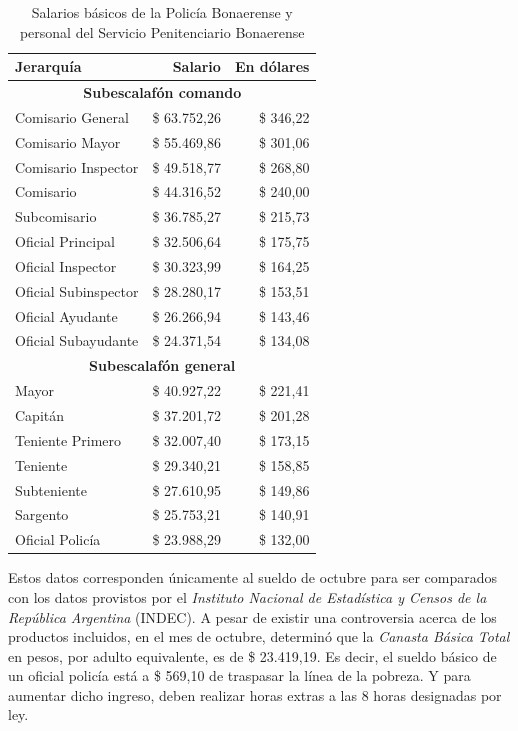 \documentclass[12pt,a4paper,twoside]{book}
\begin{document}
\begin{center}
\begin{longtable}{|l|r|r|}
\caption{Salarios básicos de la Policía Bonaerense y personal del Servicio Penitenciario Bonaerense}
\label{tab:tabla-policia-salario} \\
\hline
\textbf{Jerarquía} & \textbf{Salario} & \textbf{En dólares} \\
\hline
\multicolumn{3}{|c|}{\textbf{Subescalafón comando}} \\
\hline
Comisario General & \$ 63.752,26 & \$ 346,22 \\
\hline
Comisario Mayor & \$ 55.469,86 & \$ 301,06 \\
\hline
Comisario Inspector & \$ 49.518,77 & \$ 268,80 \\
\hline
Comisario & \$ 44.316,52 & \$ 240,00 \\
\hline
Subcomisario & \$ 36.785,27 & \$ 215,73 \\
\hline
Oficial Principal & \$ 32.506,64 & \$ 175,75 \\
\hline
Oficial Inspector & \$ 30.323,99 & \$ 164,25 \\
\hline
Oficial Subinspector & \$ 28.280,17 & \$ 153,51 \\
\hline
Oficial Ayudante & \$ 26.266,94 & \$ 143,46 \\
\hline
Oficial Subayudante & \$ 24.371,54 & \$ 134,08 \\
\hline
\multicolumn{3}{|c|}{\textbf{Subescalafón general}} \\
\hline
Mayor & \$ 40.927,22 & \$ 221,41 \\
\hline
Capitán & \$ 37.201,72 & \$ 201,28 \\
\hline
Teniente Primero & \$ 32.007,40 & \$ 173,15 \\
\hline
Teniente & \$ 29.340,21 & \$ 158,85 \\
\hline
Subteniente & \$ 27.610,95 & \$ 149,86 \\
\hline
Sargento & \$ 25.753,21 & \$ 140,91 \\
\hline
Oficial Policía & \$ 23.988,29 & \$ 132,00 \\
\hline
\end{longtable}
\end{center}

Estos datos corresponden únicamente al sueldo de octubre para ser comparados con los datos provistos por el \textit{Instituto Nacional de Estadística y Censos de la República Argentina} (INDEC). A pesar de existir una controversia acerca de los productos incluidos, en el mes de octubre, determinó que la \textit{Canasta Básica Total}
en pesos, por adulto equivalente, es de \$ 23.419,19. Es decir, el sueldo básico de un oficial policía está a \$ 569,10 de traspasar la línea de la pobreza. Y para aumentar  dicho ingreso, deben realizar horas extras a las 8 horas designadas por ley.
\end{document}

